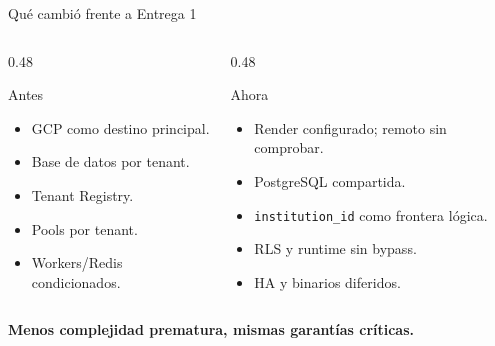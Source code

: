 \documentclass[aspectratio=169,10pt]{beamer}
\begin{document}
\begin{frame}{Qué cambió frente a Entrega 1}
\begin{columns}[T,onlytextwidth]
\begin{column}{0.48\textwidth}
\begin{block}{Antes}
\small
\begin{itemize}
  \item GCP como destino principal.
  \item Base de datos por tenant.
  \item Tenant Registry.
  \item Pools por tenant.
  \item Workers/Redis condicionados.
\end{itemize}
\end{block}
\end{column}
\begin{column}{0.48\textwidth}
\begin{block}{Ahora}
\small
\begin{itemize}
  \item Render configurado; remoto sin comprobar.
  \item PostgreSQL compartida.
  \item \texttt{institution\_id} como frontera lógica.
  \item RLS y runtime sin bypass.
  \item HA y binarios diferidos.
\end{itemize}
\end{block}
\end{column}
\end{columns}
\vspace{0.2cm}
\begin{center}
\large\textbf{\color{academixnavy}Menos complejidad prematura, mismas garantías críticas.}
\end{center}
\end{frame}
\end{document}

